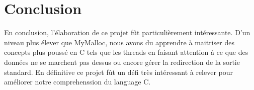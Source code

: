 \documentclass[11pt]{article}
\begin{document}
\section{Conclusion}
En conclusion, l'élaboration de ce projet fût particulièrement intéressante. D'un niveau plus élever que MyMalloc, nous avons du apprendre à maitriser des concepts plus poussé en C tels que les threads en faisant attention à ce que des données ne se marchent pas dessus ou encore gérer la redirection de la sortie standard.
En définitive ce projet fût un défi très intéressant à relever pour améliorer notre comprehenssion du language C.
\end{document}
